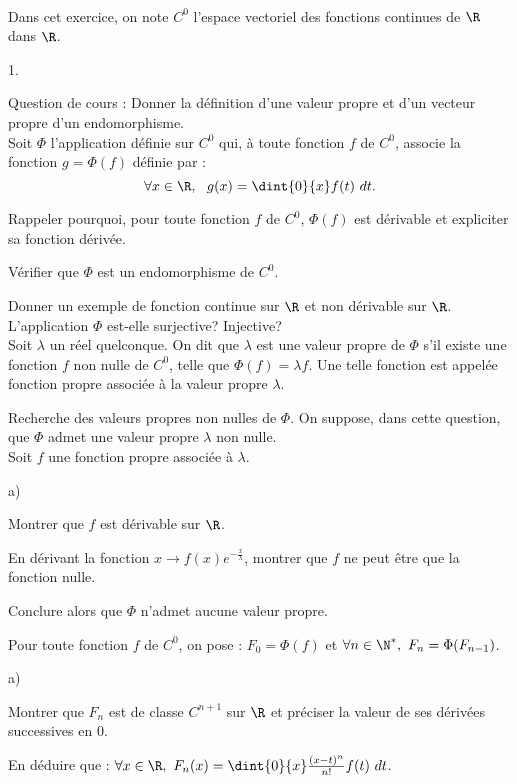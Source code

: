\documentclass[11pt]{article}%
\begin{document}
\begin{exerciceAP}~\\
  Dans cet exercice, on note $C^0$ l'espace vectoriel des fonctions
  continues de $\R$ dans $\R$.
  \begin{noliste}{1.}
    \setlength{\itemsep}{2mm}
  \item Question de cours : Donner la définition d'une valeur propre
    et d'un vecteur propre d'un endomorphisme.
    \\[.2cm]
    Soit $\Phi$ l'application définie sur $C^0$ qui, à toute fonction
    $f$ de $C^0$, associe la fonction $g = \Phi(f)$ définie par :
    \[
    \forall x \in \R,\ \ g(x) = \dint{0}{x} f(t)\ dt.
    \]
  \item Rappeler pourquoi, pour toute fonction $f$ de $C^0$, $\Phi(f)$
    est dérivable et expliciter sa fonction dérivée.
  \item Vérifier que $\Phi$ est un endomorphisme de $C^0$.
  \item Donner un exemple de fonction continue sur $\R$ et non
    dérivable sur $\R$.\\
    L'application $\Phi$ est-elle surjective? Injective? \\[.2cm]
    Soit $\lambda$ un réel quelconque. On dit que $\lambda$ est une
    valeur propre de $\Phi$ s'il existe une fonction $f$ non nulle de
    $C^0$, telle que $\Phi(f) = \lambda f$. Une telle fonction est
    appelée fonction propre associée à la valeur propre $\lambda$.
  \item Recherche des valeurs propres non nulles de $\Phi$.  On
    suppose, dans cette question, que $\Phi$ admet une valeur propre
    $\lambda$ non nulle.
    \\[.2cm]
    Soit $f$ une fonction propre associée à $\lambda$.
    \begin{noliste}{a)}
    \setlength{\itemsep}{2mm}
    \item Montrer que $f$ est dérivable sur $\R$.
    \item En dérivant la fonction $x \rightarrow f(x) e^{ -
        \frac{x}{\lambda} }$, montrer que $f$ ne peut être que la
      fonction nulle.
    \item Conclure alors que $\Phi$ n'admet aucune valeur propre.
    \end{noliste}
  \item Pour toute fonction $f$ de $C^0$, on pose : $F_0 = \Phi(f)$ et
    $\forall n \in \N^*,\ F_n = \Phi ( F_{n-1} )$. 
    \begin{noliste}{a)}
    \setlength{\itemsep}{2mm}
    \item Montrer que $F_n$ est de classe $C^{n+1}$ sur $\R$ et
      préciser la valeur de ses dérivées successives en 0.
    \item En déduire que : $\forall x \in \R,\ F_n(x) = \dint{0}{x}
      \frac{ (x-t)^n }{n!} f(t)\ dt$.
    \end{noliste}
  \end{noliste}
\end{exerciceAP}
\end{document}
